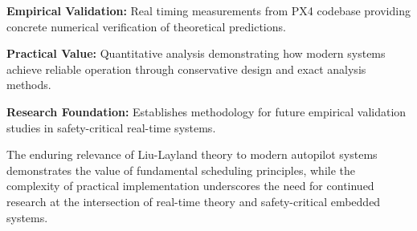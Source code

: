 \documentclass[12pt,a4paper]{article}
\begin{document}
\textbf{Empirical Validation:} Real timing measurements from PX4 codebase providing concrete numerical verification of theoretical predictions.

\textbf{Practical Value:} Quantitative analysis demonstrating how modern systems achieve reliable operation through conservative design and exact analysis methods.

\textbf{Research Foundation:} Establishes methodology for future empirical validation studies in safety-critical real-time systems.

The enduring relevance of Liu-Layland theory to modern autopilot systems demonstrates the value of fundamental scheduling principles, while the complexity of practical implementation underscores the need for continued research at the intersection of real-time theory and safety-critical embedded systems.
\end{document}
